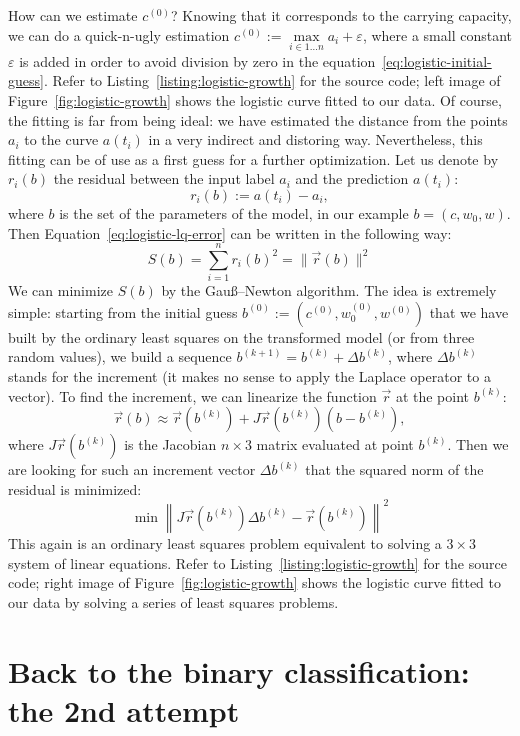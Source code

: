 \documentclass[notitlepage,oneside]{book}
\begin{document}
How can we estimate $c^{(0)}$? Knowing that it corresponds to the carrying capacity, we can do a quick-n-ugly estimation $c^{(0)}:=\max\limits_{i\in 1\dots n} a_i + \varepsilon$, where a small constant $\varepsilon$ is added in order to avoid division by
zero in the equation~\eqref{eq:logistic-initial-guess}.
Refer to Listing~\ref{listing:logistic-growth} for the source code; left image of Figure~\ref{fig:logistic-growth} shows the logistic curve fitted to our data.
Of course, the fitting is far from being ideal: we have estimated the distance from the points $a_i$ to the curve $a(t_i)$ in a very indirect and distoring way.
Nevertheless, this fitting can be of use as a first guess for a further optimization.
Let us denote by $r_i(b)$ the residual between the input label $a_i$ and the prediction $a(t_i)$:
$$r_i(b) := a(t_i) - a_i,$$
where $b$ is the set of the parameters of the model, in our example $b=(c, w_0, w)$.
Then Equation~\eqref{eq:logistic-lq-error} can be written in the following way:
\begin{equation}
\label{eq:logistic-lq-error2}
S(b) = \sum\limits_{i=1}^n r_i(b)^2 = \|\vec{r}(b)\|^2
\end{equation}
We can minimize $S(b)$ by the Gauß–Newton algorithm.
The idea is extremely simple: starting from the initial guess 
$b^{(0)} := \left(c^{(0)}, w_0^{(0)}, w^{(0)}\right)$
that we have built by the ordinary least squares on the transformed model (or from three random values),
we build a sequence $b^{(k+1)} = b^{(k)} + \Delta b^{(k)}$,
where $\Delta b^{(k)}$ stands for the increment (it makes no sense to apply the Laplace operator to a vector).
To find the increment, we can linearize the function $\vec{r}$ at the point $b^{(k)}$:
$$
\vec{r}(b) \approx \vec{r}\left(b^{(k)}\right) + J\vec{r}\left(b^{(k)}\right) \left(b - b^{(k)}\right),
$$
where $J\vec{r}\left(b^{(k)}\right)$ is the Jacobian $n\times 3$ matrix evaluated at point $b^{(k)}$.
Then we are looking for such an increment vector $ \Delta b^{(k)}$ that the squared norm of the residual is minimized:
$$
\min \left\| J\vec{r}\left(b^{(k)}\right) \Delta b^{(k)} - \vec{r}\left(b^{(k)}\right) \right\|^2
$$
This again is an ordinary least squares problem equivalent to solving a $3\times 3$ system of linear equations.
Refer to Listing~\ref{listing:logistic-growth} for the source code; right image of Figure~\ref{fig:logistic-growth} shows the logistic curve fitted to our data
by solving a series of least squares problems.


\section{Back to the binary classification: the 2nd attempt}
\label{sec:logistic1d}
\end{document}
